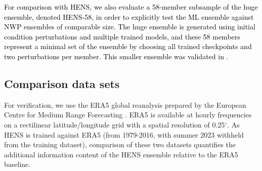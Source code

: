 \documentclass[draft]{agujournal2019}
\renewcommand{\st}[1]{\unskip}
\newcommand{\newTxt}{\textcolor{black}}
\begin{document}

\newTxt{For comparison with HENS, we also evaluate a 58-member subsample of the huge ensemble, denoted HENS-58, in order to explicitly test the ML ensemble against NWP ensembles of comparable size. %
The huge ensemble is generated using initial condition perturbations and multiple trained models, and these 58 members represent a minimal set of the ensemble by choosing all trained checkpoints and two perturbations per member.  This smaller ensemble was validated in \citet{Mahesh2024hugeensemblesidesign}. }

\subsection{Comparison data sets} \label{subsec:comparisondata}

For verification, we use the ERA5 global reanalysis prepared by the European Centre for Medium Range Forecasting \citep[ECMWF;][]{Hersbach2020}.  \st{This reanalysis provides all the data required to construct the daily maximum surface temperatures.}  ERA5 is available at hourly frequencies on a rectilinear latitude/longitude grid with a spatial resolution of 0.25${}^\circ$.   As HENS is trained against ERA5 (from 1979-2016, with summer 2023 withheld from the training dataset), comparison of these two datasets quantifies the additional information content of the HENS ensemble relative to the ERA5 baseline. %
\end{document}
